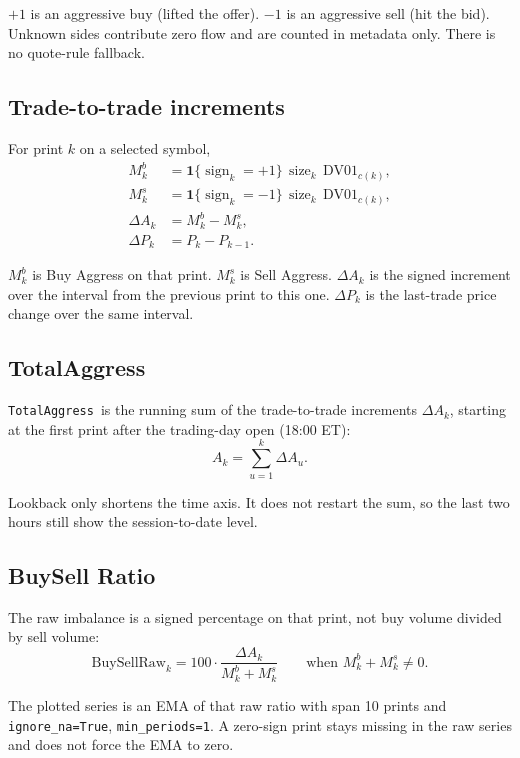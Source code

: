 \documentclass[11pt]{article}
\newcommand{\TotalAggress}{\texttt{TotalAggress}}
\begin{document}
$+1$ is an aggressive buy (lifted the offer). $-1$ is an aggressive sell (hit the bid). Unknown sides contribute zero flow and are counted in metadata only. There is no quote-rule fallback.

\subsection{Trade-to-trade increments}

For print $k$ on a selected symbol,
\begin{align}
M_k^b &= \mathbf{1}\{\operatorname{sign}_k=+1\}\,\operatorname{size}_k\,\mathrm{DV01}_{c(k)}, \\
M_k^s &= \mathbf{1}\{\operatorname{sign}_k=-1\}\,\operatorname{size}_k\,\mathrm{DV01}_{c(k)}, \\
\Delta A_k &= M_k^b-M_k^s, \\
\Delta P_k &= P_k-P_{k-1}.
\end{align}

$M_k^b$ is Buy Aggress on that print. $M_k^s$ is Sell Aggress. $\Delta A_k$ is the signed increment over the interval from the previous print to this one. $\Delta P_k$ is the last-trade price change over the same interval.

\subsection{TotalAggress}

\TotalAggress\ is the running sum of the trade-to-trade increments $\Delta A_k$, starting at the first print after the trading-day open (18:00 ET):
\begin{equation}
A_k=\sum_{u=1}^{k}\Delta A_u.
\end{equation}

Lookback only shortens the time axis. It does not restart the sum, so the last two hours still show the session-to-date level.

\subsection{BuySell Ratio}

The raw imbalance is a signed percentage on that print, not buy volume divided by sell volume:
\begin{equation}
\mathrm{BuySellRaw}_k
=100\cdot\frac{\Delta A_k}{M_k^b+M_k^s}
\qquad\text{when }M_k^b+M_k^s\neq 0.
\end{equation}

The plotted series is an EMA of that raw ratio with span 10 prints and \texttt{ignore\_na=True}, \texttt{min\_periods=1}. A zero-sign print stays missing in the raw series and does not force the EMA to zero.
\end{document}
